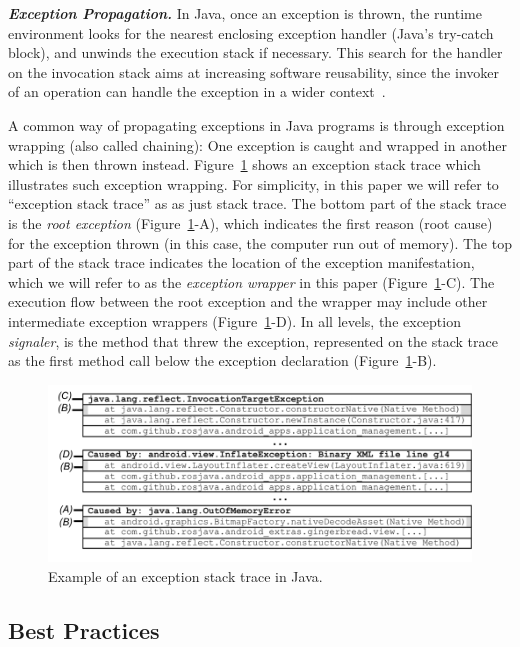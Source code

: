 \documentclass[conference]{IEEEtran}
\begin{document}
\emph{\textbf{Exception Propagation.}} In Java, once an exception is thrown, 
the runtime environment looks for the nearest enclosing exception handler
(Java's try-catch block), and unwinds the execution stack if necessary.
This search for the handler on the invocation stack aims at increasing software reusability, 
since the invoker of an operation can handle the exception in a wider context~\cite{miller1997issues}.

 A common way of  propagating exceptions in Java programs is through
 exception wrapping (also called chaining):
One exception 
is caught and wrapped in another which is then thrown instead. Figure~\ref{fig:wrapping} shows 
an exception stack trace which illustrates such exception wrapping. 
For simplicity, in this paper we will refer to ``exception stack trace'' as as just stack trace.
The bottom part of the stack trace is the \emph{root exception} (Figure~\ref{fig:wrapping}-A), which indicates
the first reason (root cause) for the exception thrown (in this case, the computer run out of
memory). The top part of the stack trace indicates the location of the exception
manifestation, which we will refer to as the \emph{exception wrapper} in this paper (Figure~\ref{fig:wrapping}-C). The
execution flow  between the root exception and the wrapper may
include other intermediate exception wrappers (Figure~\ref{fig:wrapping}-D). In all levels, the exception
\emph{signaler}, is the method that threw the exception, represented on the
stack trace as the first method call below the exception declaration (Figure~\ref{fig:wrapping}-B).

\begin{figure} \centering \includegraphics[scale=0.55]{stack_review6.png}
\caption{Example of an exception stack trace in Java.}
\label{fig:wrapping}
\end{figure}

\subsection{Best Practices}
\label{sec:best}
\end{document}
